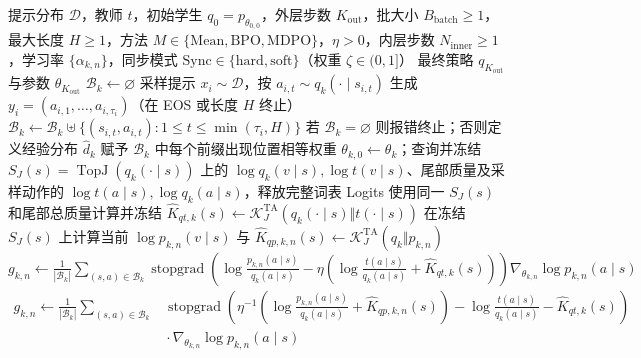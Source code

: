 \documentclass[lang=cn,scheme=chinese,openany]{elegantbook}
\newcommand{\sg}{\operatorname{stopgrad}}
\begin{document}
\begin{algorithm}[ht]
\caption{Tail-Aware OPD 外层--内层主优化算法\\{\small\textit{数学语义：冻结外层 Rollout，以 Tail-Aware KL 中心运行 Mean、BPO 或 MDPO，再同步并重新 Rollout}}}
\begin{algorithmic}[1]
\Require 提示分布 $\mathcal D$，教师 $t$，初始学生 $q_0=p_{\theta_{0,0}}$，外层步数 $K_{\mathrm{out}}$，批大小 $B_{\mathrm{batch}}\ge1$，最大长度 $H\ge1$，方法 $M\in\{\mathrm{Mean},\mathrm{BPO},\mathrm{MDPO}\}$，$\eta>0$，内层步数 $N_{\mathrm{inner}}\ge1$，学习率 $\{\alpha_{k,n}\}$，同步模式 $\mathrm{Sync}\in\{\mathrm{hard},\mathrm{soft}\}$（权重 $\zeta\in(0,1]$）
\Ensure 最终策略 $q_{K_{\mathrm{out}}}$ 与参数 $\theta_{K_{\mathrm{out}}}$
    \State $\mathcal B_k\gets\varnothing$
        \State 采样提示 $x_i\sim\mathcal D$，按 $a_{i,t}\sim q_k(\cdot\mid s_{i,t})$ 生成 $y_i=(a_{i,1},\ldots,a_{i,\tau_i})$（在 EOS 或长度 $H$ 终止）
        \State $\mathcal B_k\gets\mathcal B_k\mathbin{\uplus}\{(s_{i,t},a_{i,t}):1\le t\le\min(\tau_i,H)\}$
    \EndFor
    \State 若 $\mathcal B_k=\varnothing$ 则报错终止；否则定义经验分布 $\widehat d_k$ 赋予 $\mathcal B_k$ 中每个前缀出现位置相等权重
    \State $\theta_{k,0}\gets\theta_k$；查询并冻结 $S_J(s)=\operatorname{TopJ}(q_k(\cdot\mid s))$ 上的 $\log q_k(v\mid s),\log t(v\mid s)$、尾部质量及采样动作的 $\log t(a\mid s),\log q_k(a\mid s)$，释放完整词表 Logits
    \State 使用同一 $S_J(s)$ 和尾部总质量计算并冻结 $\widehat K_{qt,k}(s)\gets\mathcal K_J^{\mathrm{TA}}(q_k(\cdot\mid s)\Vert t(\cdot\mid s))$
        \State 在冻结 $S_J(s)$ 上计算当前 $\log p_{k,n}(v\mid s)$ 与 $\widehat K_{qp,k,n}(s)\gets\mathcal K_J^{\mathrm{TA}}(q_k\Vert p_{k,n})$
            \State $g_{k,n}\gets\frac1{|\mathcal B_k|}\sum_{(s,a)\in\mathcal B_k}\sg\!\left(\log\frac{p_{k,n}(a\mid s)}{q_k(a\mid s)}-\eta\left(\log\frac{t(a\mid s)}{q_k(a\mid s)}+\widehat K_{qt,k}(s)\right)\right)\nabla_{\theta_{k,n}}\log p_{k,n}(a\mid s)$
            \State $\begin{aligned}g_{k,n}\gets\frac1{|\mathcal B_k|}\sum_{(s,a)\in\mathcal B_k}&\sg\!\left(\eta^{-1}\left(\log\frac{p_{k,n}(a\mid s)}{q_k(a\mid s)}+\widehat K_{qp,k,n}(s)\right)-\log\frac{t(a\mid s)}{q_k(a\mid s)}-\widehat K_{qt,k}(s)\right)\\&{}\cdot\nabla_{\theta_{k,n}}\log p_{k,n}(a\mid s)\end{aligned}$

\end{algorithmic}
\end{algorithm}
\end{document}
